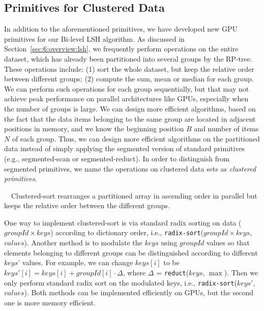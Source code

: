 \subsection{Primitives for Clustered Data}
In addition to the aforementioned primitives, we have developed new GPU primitives for our Bi-level LSH algorithm. As discussed in Section~\ref{sec:6:overview:lsh}, we frequently perform operations
on the entire dataset, which has already been partitioned into several groups by the RP-tree. These operations include: (1) sort the whole
dataset, but keep the relative order between different groups; (2) compute the sum, mean or median for each group. We can perform such operations for each group sequentially, but that may not achieve peak performance on parallel architectures like GPUs, especially when the number of groups is large. We can design more efficient algorithms, based on the fact that the data items belonging to the same group are located in adjacent positions in memory, and we know the beginning position $B$ and number of items $N$ of each group. Thus, we can design more efficient algorithms on the partitioned data instead of simply applying the segmented version of standard primitives (e.g., segmented-scan or segmented-reduct). In order to distinguish from segmented primitives, we name the operations on clustered data sets as \emph{clustered primitives}.

 \ \ Clustered-sort rearranges a partitioned array in ascending order in parallel but keeps the relative order between the different groups.

\noindent {}

One way to implement clustered-sort is via standard radix sorting on data ($groupId \times keys$) according to dictionary order, i.e., \texttt{radix-sort}($groupId \times keys$, $values$). Another method is to modulate the $keys$ using $groupId$ values so that elements belonging to different groups can be distinguished according to different $keys$' values. For example, we can change $keys[i]$ to be $keys'[i] = keys[i] + groupId[i] \cdot \Delta$, where $\Delta$ = \texttt{reduct}($keys$, $\max$). Then we only perform standard radix sort on the modulated keys, i.e., \texttt{radix-sort}($keys'$, $values$). Both methods can be implemented efficiently on GPUs, but the second one is more memory efficient.

